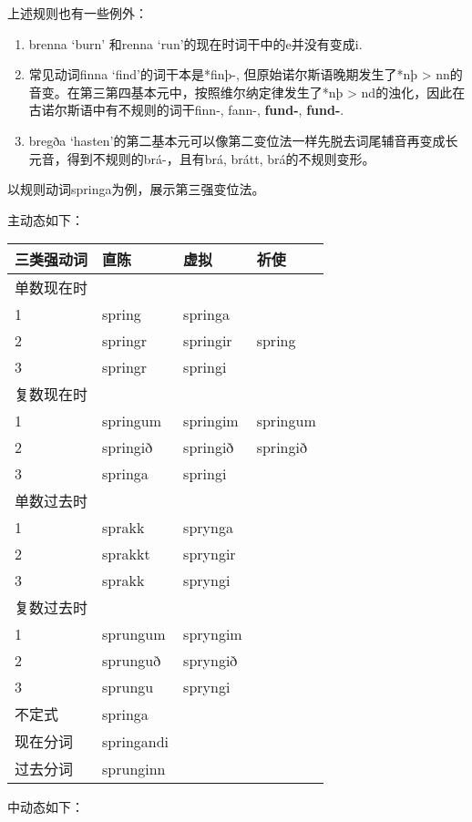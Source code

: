 上述规则也有一些例外：

\begin{enumerate}
\def\labelenumi{\arabic{enumi})}
\item
  brenna `burn‌' 和renna `run‌'的现在时词干中的e并没有变成i.
\item
  \label{_Ref116921872}{}常见动词finna
  `find‌'的词干本是*finþ-, 但原始诺尔斯语晚期发生了*nþ \textgreater{}
  nn的音变。在第三第四基本元中，按照维尔纳定律发生了*nþ \textgreater{}
  nd的浊化，因此在古诺尔斯语中有不规则的词干finn-, fann-,
  \textbf{fund-}, \textbf{fund-}.
\item
  bregða
  `hasten‌'的第二基本元可以像第二变位法一样先脱去词尾辅音再变成长元音，得到不规则的brá-，且有brá,
  brátt, brá的不规则变形。
\end{enumerate}

以规则动词springa为例，展示第三强变位法。

主动态如下：

\begin{longtable}{llll}
\toprule
三类强动词 & 直陈 & 虚拟 & 祈使 \\
\midrule
\endhead
\bottomrule
\endfoot
单数现在时 & & & \\
1 & spring & springa & \\
2 & springr & springir & spring \\
3 & springr & springi & \\
复数现在时 & & & \\
1 & springum & springim & springum \\
2 & springið & springið & springið \\
3 & springa & springi & \\
单数过去时 & & & \\
1 & sprakk & sprynga & \\
2 & sprakkt & spryngir & \\
3 & sprakk & spryngi & \\
复数过去时 & & & \\
1 & sprungum & spryngim & \\
2 & sprunguð & spryngið & \\
3 & sprungu & spryngi & \\
不定式 & springa & & \\
现在分词 & springandi & & \\
过去分词 & sprunginn & & \\
\end{longtable}

中动态如下：

